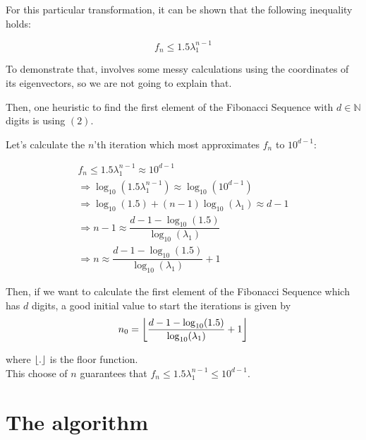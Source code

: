 \documentclass{article}
\DeclarePairedDelimiter\floor{\lfloor}{\rfloor}
\begin{document}
\newpage
For this particular transformation, it can be shown that the following 
inequality holds:

\begin{equation}
    f_n \leq 1.5 \lambda_1 ^{n - 1}
\end{equation}

To demonstrate that, involves some messy calculations using the coordinates of
its eigenvectors, so we are not going to explain that.

Then, one heuristic to find the first element of the Fibonacci Sequence with
$d \in \mathbb{N}$ digits is using $(2)$.

Let's calculate the $n$'th iteration which most approximates $f_n$ to $10^{d - 1}$:

\begin{equation*}
    \begin{aligned}
        f_n \leq 1.5\lambda_1 ^{n - 1} \approx 10^{d-1}\\
        \Rightarrow \log_{10}(1.5\lambda_1 ^{n - 1}) \approx
                                            \log_{10}(10^{d-1})\\
        \Rightarrow \log_{10}(1.5) + (n - 1) \log_{10}(\lambda_1)
                                    \approx d - 1\\
        \Rightarrow n - 1 \approx \dfrac{d - 1 - \log_{10}(1.5)}{\log_{10}(\lambda_1)}\\
        \Rightarrow n  \approx {\dfrac{d - 1 - \log_{10}(1.5)}{\log_{10}(\lambda_1)} + 1}
    \end{aligned}
\end{equation*}

Then, if we want to calculate the first element of the Fibonacci Sequence which
has $d$ digits, a good initial value to start the iterations is
given by
\begin{equation*}
    n_0 = \floor*{\dfrac{d  - 1- \log_{10}(1.5)}{\log_{10}(\lambda_1)} + 1}
\end{equation*}

where $\floor{.}$ is the floor function.\\

This choose of $n$ guarantees that
$f_n \leq 1.5\lambda_1 ^{n - 1} \leq 10^{d - 1}$.\\

\newpage
\section*{The algorithm}
\end{document}
